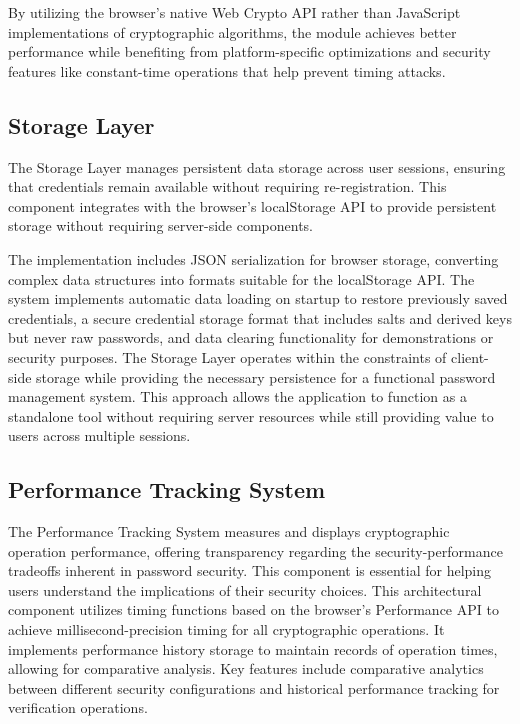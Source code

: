 \documentclass[11pt,a4paper]{article}
\begin{document}
By utilizing the browser's native Web Crypto API rather than JavaScript implementations of cryptographic algorithms, the module achieves better performance while benefiting from platform-specific optimizations and security features like constant-time operations that help prevent timing attacks.

\subsection{Storage Layer}
The Storage Layer manages persistent data storage across user sessions, ensuring that credentials remain available without requiring re-registration. This component integrates with the browser's localStorage API to provide persistent storage without requiring server-side components.

The implementation includes JSON serialization for browser storage, converting complex data structures into formats suitable for the localStorage API. The system implements automatic data loading on startup to restore previously saved credentials, a secure credential storage format that includes salts and derived keys but never raw passwords, and data clearing functionality for demonstrations or security purposes.
The Storage Layer operates within the constraints of client-side storage while providing the necessary persistence for a functional password management system. This approach allows the application to function as a standalone tool without requiring server resources while still providing value to users across multiple sessions.

\subsection{Performance Tracking System}
The Performance Tracking System measures and displays cryptographic operation performance, offering transparency regarding the security-performance tradeoffs inherent in password security. This component is essential for helping users understand the implications of their security choices.
This architectural component utilizes timing functions based on the browser's Performance API to achieve millisecond-precision timing for all cryptographic operations. It implements performance history storage to maintain records of operation times, allowing for comparative analysis. Key features include comparative analytics between different security configurations and historical performance tracking for verification operations.
\end{document}
